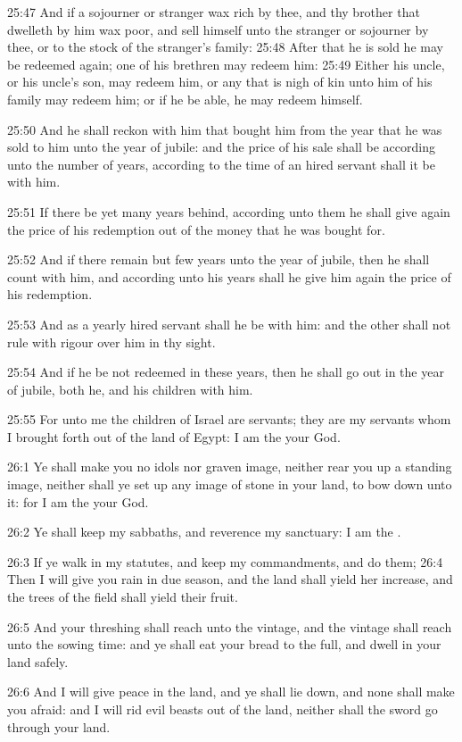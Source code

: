 25:47 And if a sojourner or stranger wax rich by thee, and thy brother that dwelleth by him wax poor, and sell himself unto the stranger or sojourner by thee, or to the stock of the stranger's family: 25:48 After that he is sold he may be redeemed again; one of his brethren may redeem him: 25:49 Either his uncle, or his uncle's son, may redeem him, or any that is nigh of kin unto him of his family may redeem him; or if he be able, he may redeem himself.

25:50 And he shall reckon with him that bought him from the year that he was sold to him unto the year of jubile: and the price of his sale shall be according unto the number of years, according to the time of an hired servant shall it be with him.

25:51 If there be yet many years behind, according unto them he shall give again the price of his redemption out of the money that he was bought for.

25:52 And if there remain but few years unto the year of jubile, then he shall count with him, and according unto his years shall he give him again the price of his redemption.

25:53 And as a yearly hired servant shall he be with him: and the other shall not rule with rigour over him in thy sight.

25:54 And if he be not redeemed in these years, then he shall go out in the year of jubile, both he, and his children with him.

25:55 For unto me the children of Israel are servants; they are my servants whom I brought forth out of the land of Egypt: I am the \LORD your God.

26:1 Ye shall make you no idols nor graven image, neither rear you up a standing image, neither shall ye set up any image of stone in your land, to bow down unto it: for I am the \LORD your God.

26:2 Ye shall keep my sabbaths, and reverence my sanctuary: I am the \LORD.

26:3 If ye walk in my statutes, and keep my commandments, and do them; 26:4 Then I will give you rain in due season, and the land shall yield her increase, and the trees of the field shall yield their fruit.

26:5 And your threshing shall reach unto the vintage, and the vintage shall reach unto the sowing time: and ye shall eat your bread to the full, and dwell in your land safely.

26:6 And I will give peace in the land, and ye shall lie down, and none shall make you afraid: and I will rid evil beasts out of the land, neither shall the sword go through your land.

